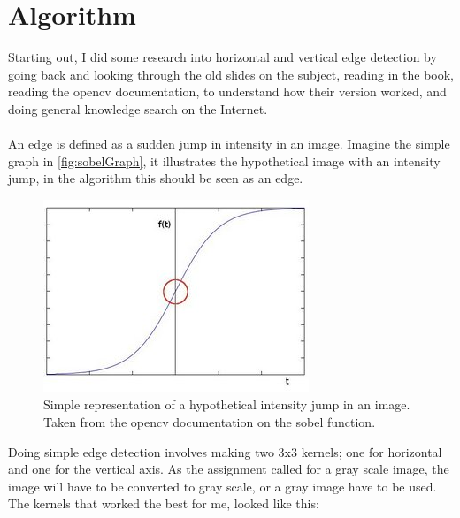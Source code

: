 \chapter{Algorithm}
	Starting out, I did some research into horizontal and vertical edge detection by going back and looking through the old slides on the subject, reading in the book, reading the opencv documentation, to understand how their version worked, and doing general knowledge search on the Internet.\\
	\\
	An edge is defined as a sudden jump in intensity in an image. Imagine the simple graph in \autoref{fig:sobelGraph}, it illustrates the hypothetical image with an intensity jump, in the algorithm this should be seen as an edge.
	
	\begin{figure}[H]
		\centering
		\includegraphics[width=0.4\linewidth]{figure/sobelGraph}
		\caption{Simple representation of a hypothetical intensity jump in an image. Taken from the opencv documentation on the sobel function.}
		\label{fig:sobelGraph}
	\end{figure} 
	
	Doing simple edge detection involves making two 3x3 kernels; one for horizontal and one for the vertical axis. As the assignment called for a gray scale image, the image will have to be converted to gray scale, or a gray image have to be used. The kernels that worked the best for me, looked like this:
	
